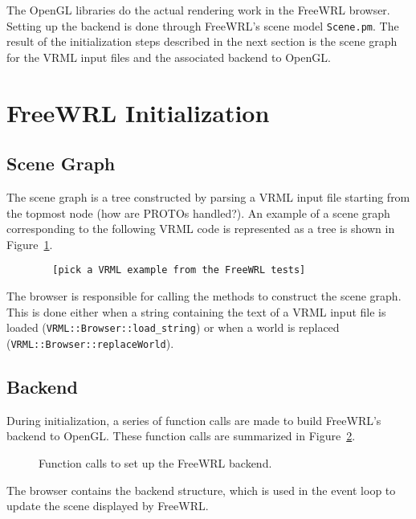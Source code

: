\documentclass[12pt,letterpaper]{article}
\begin{document}
    The OpenGL libraries do the actual rendering work in the FreeWRL
    browser.
    Setting up the backend is done through FreeWRL's scene model
    \texttt{Scene.pm}.
    The result of the initialization steps described in the next section
    is the scene graph for the VRML input files and the associated backend
    to OpenGL.


    \section{FreeWRL Initialization}

	\subsection{Scene Graph}

	The scene graph is a tree constructed by parsing a VRML input file
	starting from the topmost node (how are PROTOs handled?).
	An example of a scene graph corresponding to the following VRML code
	is represented as a tree is shown in Figure~\ref{fig:sg-tree}.

	\begin{verbatim}
	    [pick a VRML example from the FreeWRL tests]
	\end{verbatim}

	\begin{figure}[!ht]
	    \centering
	    \caption{}\label{fig:sg-tree}
	\end{figure}

	The browser is responsible for calling the methods to construct the
	scene graph.
	This is done either when a string containing the text of a VRML input
	file is loaded (\texttt{VRML::Browser::load\_string}) or when a world is
	replaced (\texttt{VRML::Browser::replaceWorld}).

	\subsection{Backend}

	During initialization, a series of function calls are made to
	build FreeWRL's backend to OpenGL.
	These function calls are summarized in Figure~\ref{fig:be-setup}.

	\begin{figure}[!ht]
	    \centering
	    \caption{Function calls to set up the FreeWRL backend.}\label{fig:be-setup}
	\end{figure}

	The browser contains the backend structure, which is used in the event
	loop to update the scene displayed by FreeWRL.
\end{document}
